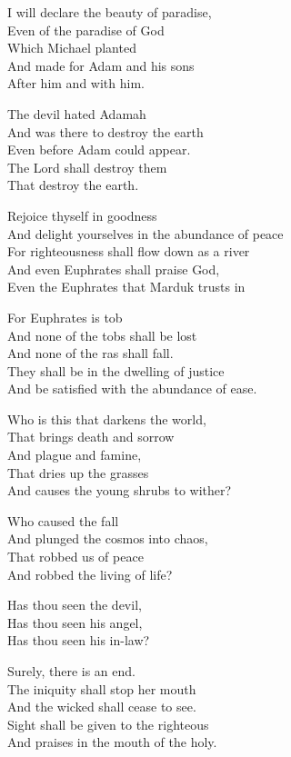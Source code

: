 \documentclass[
]{book}
\begin{document}
I will declare the beauty of paradise,\\
Even of the paradise of God\\
Which Michael planted\\
And made for Adam and his sons\\
After him and with him.

The devil hated Adamah\\
And was there to destroy the earth\\
Even before Adam could appear.\\
The Lord shall destroy them\\
That destroy the earth.

Rejoice thyself in goodness\\
And delight yourselves in the abundance of peace\\
For righteousness shall flow down as a river\\
And even Euphrates shall praise God,\\
Even the Euphrates that Marduk trusts in

For Euphrates is tob\\
And none of the tobs shall be lost\\
And none of the ras shall fall.\\
They shall be in the dwelling of justice\\
And be satisfied with the abundance of ease.

Who is this that darkens the world,\\
That brings death and sorrow\\
And plague and famine,\\
That dries up the grasses\\
And causes the young shrubs to wither?

Who caused the fall\\
And plunged the cosmos into chaos,\\
That robbed us of peace\\
And robbed the living of life?

Has thou seen the devil,\\
Has thou seen his angel,\\
Has thou seen his in-law?

Surely, there is an end.\\
The iniquity shall stop her mouth\\
And the wicked shall cease to see.\\
Sight shall be given to the righteous\\
And praises in the mouth of the holy.
\end{document}
